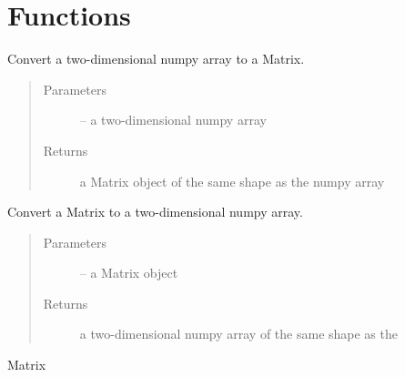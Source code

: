 \documentclass[letterpaper,10pt,english]{sphinxmanual}
\begin{document}
\chapter{Functions}
\label{\detokenize{index:functions}}

\begin{fulllineitems}
\label{\detokenize{index:dbm_py.interface.np2darray_to_float_matrix}}
Convert a two-dimensional numpy array to a Matrix.
\begin{quote}\begin{description}
\item[{Parameters}] \leavevmode
{} -- a two-dimensional numpy array

\item[{Returns}] \leavevmode
a Matrix object of the same shape as the numpy array

\end{description}\end{quote}

\end{fulllineitems}


\begin{fulllineitems}
\label{\detokenize{index:dbm_py.interface.float_matrix_to_np2darray}}
Convert a Matrix to a two-dimensional numpy array.
\begin{quote}\begin{description}
\item[{Parameters}] \leavevmode
{} -- a Matrix object

\item[{Returns}] \leavevmode
a two-dimensional numpy array of the same shape as the

\end{description}\end{quote}

Matrix

\end{fulllineitems}

\end{document}
